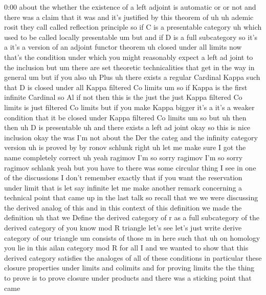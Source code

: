 \begin{unfinished}{0:00}
about  the  whether  the  existence  of  a
left  adjoint  is  automatic  or  or  not  and
there  was  a  claim  that  it  was  and  it's
justified  by  this  theorem  of
uh
uh
ademic
rosit  they  call  called  reflection
principle  so  if  C  is  a  presentable
category  uh  which  used  to  be  called
locally  presentable  um  but
and  if  D  is  a  full
subcategory  so  it's  a  it's  a  version  of
an  adjoint  functor
theorem  uh  closed  under  all
limits  now  that's  the  condition  under
which  you  might  reasonably  expect  a  left
ad  joint  to  the  inclusion  but  um  there
are  set  theoretic  technicalities  that
get  in  the  way  in  general  um  but  if  you
also  uh  Plus
uh  there  exists  a  regular
Cardinal  Kappa  such  that  D  is  closed
under  all  Kappa  filtered  Co
limits  um  so  if  Kappa  is  the  first
infinite  Cardinal  so  Al  if  not  then  this
is  the  just  the  just  Kappa  filtered  Co
limits  is  just  filtered  Co  limits  but  if
you  make  Kappa  bigger  it's  a  it's  a
weaker  condition  that  it  be  closed  under
Kappa  filtered  Co  limits  um  so  but  uh
then  then  uh  D  is
presentable  uh  and  there  exists  a  left
ad
joint  okay  so  this  is  nice  inclusion
okay  the  was  I'm  not  about  the  Der  the
categ
and  the  infinity  category
version  uh  is  proved
by  by
ronov
schlunk  right  uh  let  me  make  sure  I  got
the  name  completely  correct  uh  yeah
ragimov  I'm  so  sorry  ragimov  I'm  so
sorry  ragimov  schlank  yeah  but  you  have
to  there  was  some  circular  thing  I  see
in  one  of  the  discussions  I  don't
remember  exactly  that  if  you  want  the
reservation  under  limit  that  is  let  say
infinite  let  me  make  another  remark
concerning  a  technical  point  that  came
up  in  the  last  talk  so  recall  that  we  we
were  discussing  the  derived  analog  of
this  and  in  this  context  of  this
definition  we  made  the  definition  uh
that  we  Define  the  derived  category  of  r
as  a  full  subcategory  of  the  derived
category  of  you  know  mod  R  triangle
let's  see  let's  just  write  derive
category  of  our
triangle  um  consists  of
those  m  in  here  such  that  uh  on  homology
you  lie  in  this  ailan  category  mod  R  for
all  I  and  we  wanted  to  show  that  this
derived  category  satisfies  the  analoges
of  all  of  these  conditions  in  particular
these  closure  properties  under  limits
and  colimits
and  for  proving  limits  the  the  thing  to
prove  is  to  prove  closure  under  products
and  there  was  a  sticking  point  that  came

\end{unfinished}
